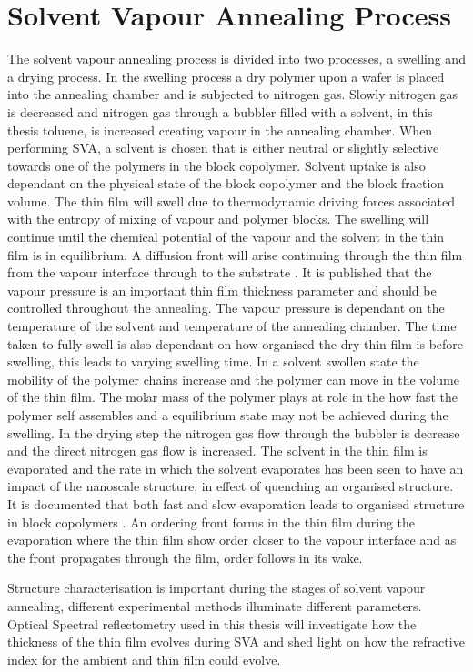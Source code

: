 \documentclass[MasterThesisMain.tex]{subfiles}
\begin{document}
\section{Solvent Vapour Annealing Process}
The solvent vapour annealing process is divided into two processes, a swelling and a drying process. In the swelling process a dry polymer upon a wafer is placed into the annealing chamber and is subjected to nitrogen gas. Slowly nitrogen gas is decreased and nitrogen gas through a bubbler filled with a solvent, in this thesis toluene, is increased creating vapour in the annealing chamber. When performing SVA, a solvent is chosen that is either neutral or slightly selective towards one of the polymers in the block copolymer. Solvent uptake is also dependant on the physical state of the block copolymer and the block fraction volume. The thin film will swell due to thermodynamic driving forces associated with the entropy of mixing of vapour and polymer blocks. The swelling will continue until the chemical potential of the vapour and the solvent in the thin film is in equilibrium. A diffusion front will arise continuing through the thin film from the vapour interface through to the substrate \cite{SVABCP}. It is published that the vapour pressure is an important thin film thickness parameter and should be controlled throughout the annealing. The vapour pressure is dependant on the temperature of the solvent and temperature of the annealing chamber. The time taken to fully swell is also dependant on how organised the dry thin film is before swelling, this leads to varying swelling time. In a solvent swollen state the mobility of the polymer chains increase and the polymer can move in the volume of the thin film. The molar mass of the polymer plays at role in the how fast the polymer self assembles and a equilibrium state may not be achieved during the swelling. In the drying step the nitrogen gas flow through the bubbler is decrease and the direct nitrogen gas flow is increased. The solvent in the thin film is evaporated and the rate in which the solvent evaporates has been seen to have an impact of the nanoscale structure, in effect of quenching an organised structure. It is documented that both fast and slow evaporation leads to organised structure in block copolymers \cite{SVABCP}. An ordering front forms in the thin film during the evaporation where the thin film show order closer to the vapour interface and as the front propagates through the film, order follows in its wake\cite{SVABCP}. 

Structure characterisation is important during the stages of solvent vapour annealing, different experimental methods illuminate different parameters. Optical Spectral reflectometry used in this thesis will investigate how the thickness of the thin film evolves during SVA and shed light on how the refractive index for the ambient and thin film could evolve. 
\end{document}
